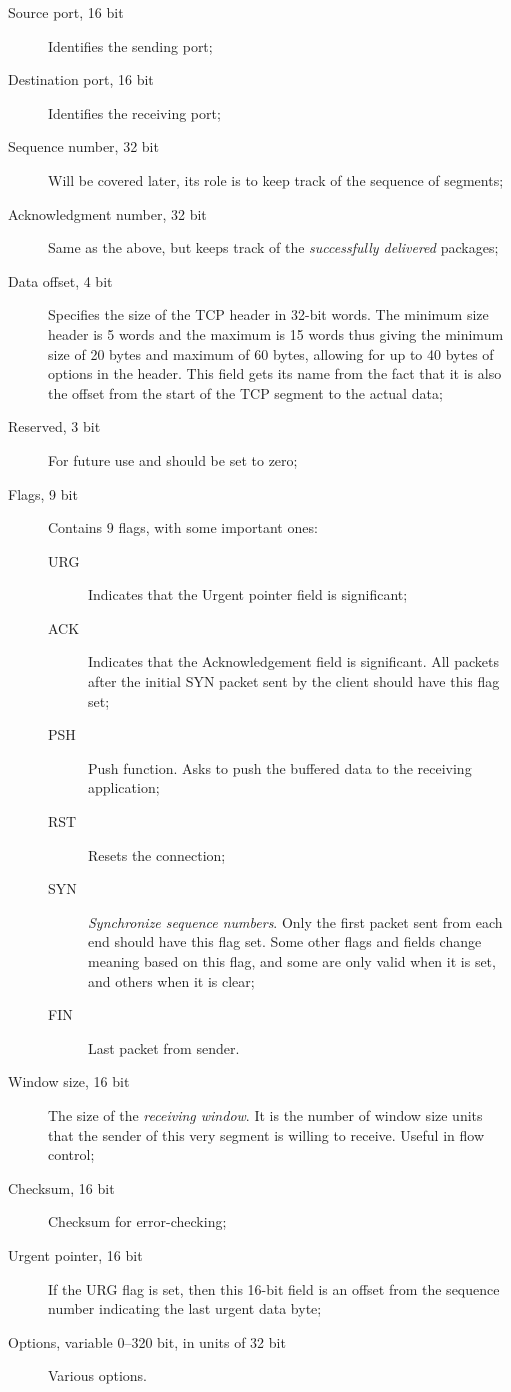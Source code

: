 \documentclass[10pt]{book}
\begin{document}
\begin{description}
    \item[Source port, 16 bit] Identifies the sending port;
    \item[Destination port, 16 bit] Identifies the receiving port;
    \item[Sequence number, 32 bit] Will be covered later, its role is to keep
        track of the sequence of segments;
    \item[Acknowledgment number, 32 bit] Same as the above, but keeps track
        of the \emph{successfully delivered} packages;
    \item[Data offset, 4 bit] Specifies the size of the TCP header in 32-bit
        words. The minimum size header is 5 words and the maximum is 15 words
        thus giving the minimum size of 20 bytes and maximum of 60 bytes,
        allowing for up to 40 bytes of options in the header. This field gets
        its name from the fact that it is also the offset from the start of the
        TCP segment to the actual data;
    \item[Reserved, 3 bit] For future use and should be set to zero;
    \item[Flags, 9 bit] Contains $9$ flags, with some important ones:
        \begin{description}
            \item[URG] Indicates that the Urgent pointer field is significant;
            \item[ACK] Indicates that the Acknowledgement field is significant. All
                packets after the initial SYN packet sent by the client should have
                this flag set;
            \item[PSH] Push function. Asks to push the buffered data to the
                receiving application;
            \item[RST] Resets the connection;
            \item[SYN] \emph{Synchronize sequence numbers}. Only the first packet sent
                from each end should have this flag set. Some other flags and
                fields change meaning based on this flag, and some are only valid
                when it is set, and others when it is clear;
            \item[FIN] Last packet from sender.
        \end{description}
    \item[Window size, 16 bit] The size of the \emph{receiving window}. It is
        the number of window size units that the sender of this very segment is
        willing to receive. Useful in flow control;
    \item[Checksum, 16 bit] Checksum for error\--checking;
    \item[Urgent pointer, 16 bit] If the URG flag is set, then this 16-bit
        field is an offset from the sequence number indicating the last urgent
        data byte;
    \item[Options, variable 0–320 bit, in units of 32 bit] Various options.
\end{description}
\end{document}
